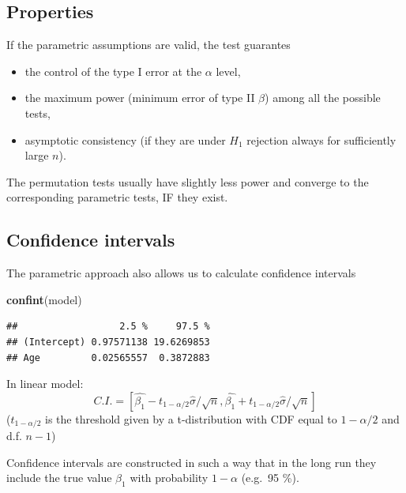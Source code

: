 \documentclass[]{article}
\newenvironment{Shaded}{\begin{snugshade}}{\end{snugshade}}
\newcommand{\KeywordTok}[1]{\textcolor[rgb]{0.13,0.29,0.53}{\textbf{#1}}}
\newcommand{\NormalTok}[1]{#1}
\providecommand{\tightlist}{%
  \setlength{\itemsep}{0pt}\setlength{\parskip}{0pt}}
\begin{document}
\hypertarget{properties}{%
\subsection{Properties}\label{properties}}

If the parametric assumptions are valid, the test guarantes

\begin{itemize}
\tightlist
\item
  the control of the type I error at the \(\alpha\) level,\\
\item
  the maximum power (minimum error of type II \(\beta\)) among all the
  possible tests,\\
\item
  asymptotic consistency (if they are under \(H_1\) rejection always for
  sufficiently large \(n\)).
\end{itemize}

The permutation tests usually have slightly less power and converge to
the corresponding parametric tests, IF they exist.

\hypertarget{confidence-intervals}{%
\subsection{Confidence intervals}\label{confidence-intervals}}

The parametric approach also allows us to calculate confidence intervals

\begin{Shaded}
\begin{Highlighting}[]
\KeywordTok{confint}\NormalTok{(model)}
\end{Highlighting}
\end{Shaded}

\begin{verbatim}
##                  2.5 %     97.5 %
## (Intercept) 0.97571138 19.6269853
## Age         0.02565557  0.3872883
\end{verbatim}

In linear model:
\[C.I.= [ \hat{\beta_1}-t_{1-\alpha/2} \hat{\sigma}/\sqrt{n}, \hat{\beta_1}+t_{1-\alpha/2} \hat{\sigma}/\sqrt{n}]\]
(\(t_{1-\alpha/2}\) is the threshold given by a t-distribution with CDF
equal to \(1-\alpha/2\) and d.f. \(n-1\))

Confidence intervals are constructed in such a way that in the long run
they include the true value \(\beta_1\) with probability \(1-\alpha\)
(e.g.~95 \%).
\end{document}
